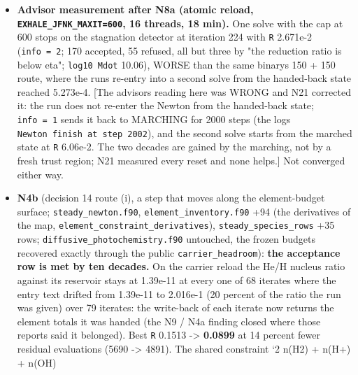 \documentclass[english,a4paper]{my_memo}
\begin{document}
\begin{itemize}
  3.800e-2 at 150, \texttt{info\ =\ 1}), and the run\textquotesingle s SECOND stationary solve (the
  code re-enters the Newton from the handed-back state, another 150
  iterations) reaches \textbf{\texttt{\textbar{}\textbar{}R\textbar{}\textbar{}} 5.273e-4, flux spread 2.3e-6}, still not
  certified (\texttt{log10\ Mdot} 10.10; exit 2), 32 min at 16 threads: the reload now
  descends four decades in 300 iterations where it stood still since B5m.
  Not converged. \textbf{Reported, not fixed}: \texttt{n\_eq\_sweeps\_model\ =\ 1} so the
  pass count, not \texttt{eq\_sweep\_reltol}, controls the closure on both
  fixtures; \texttt{EXHALE\_JFNK\_MAXIT} caps each solve, not the run;
  \texttt{fix\_active\_species\_bounds} lost its \texttt{D} argument (the epsilon-active
  width now on \texttt{state\_column\_scale}); the \texttt{{[}diag\ 4{]}} true-residual row is
  not valid for long steps (its finite-difference product is out of range).
  The fixture README updated by the advisor.
\item
  \textbf{Advisor measurement after N8a (atomic reload, \texttt{EXHALE\_JFNK\_MAXIT=600},
  16 threads, 18 min).} One solve with the cap at 600 stops on the
  stagnation detector at iteration 224 with \texttt{\textbar{}\textbar{}R\textbar{}\textbar{}} 2.671e-2 (\texttt{info\ =\ 2};
  170 accepted, 55 refused, all but three by "the reduction ratio is below
  eta"; \texttt{log10\ Mdot} 10.06), WORSE than the same binary\textquotesingle s 150 + 150 route,
  where the run\textquotesingle s re-entry into a second solve from the handed-back state
  reached 5.273e-4. {[}The advisor\textquotesingle s reading here was WRONG and N21 corrected it: the
  run does not re-enter the Newton from the handed-back state; \texttt{info\ =\ 1}
  sends it back to MARCHING for 2000 steps (the log\textquotesingle s \texttt{Newton\ finish\ at\ step\ 2002}), and the second solve starts from the marched state at
  \texttt{\textbar{}\textbar{}R\textbar{}\textbar{}} 6.06e-2. The two decades are gained by the marching, not by a
  fresh trust region; N21 measured every reset and none helps.{]} Not
  converged either way.
\item
  \textbf{N4b} (decision 14 route (i), a step that moves along the element-budget
  surface; \texttt{steady\_newton.f90}, \texttt{element\_inventory.f90} +94 (the
  derivatives of the map, \texttt{element\_constraint\_derivatives}),
  \texttt{steady\_species\_rows} +35 rows; \texttt{diffusive\_photochemistry.f90} untouched,
  the frozen budgets recovered exactly through the public
  \texttt{carrier\_headroom}): \textbf{the acceptance row is met by ten decades.} On the
  carrier reload the He/H nucleus ratio against its reservoir stays at
  1.39e-11 at every one of 68 iterates where the entry text drifted from
  1.39e-11 to 2.016e-1 (20 percent of the ratio the run was given) over 79
  iterates: the write-back of each iterate now returns the element totals
  it was handed (the N9 / N4a finding closed where those reports said it
  belonged). Best \texttt{\textbar{}\textbar{}R\textbar{}\textbar{}} 0.1513 -\textgreater{} \textbf{0.0899} at 14 percent fewer residual
  evaluations (5690 -\textgreater{} 4891). The shared constraint `2 n(H2) + n(H+) + n(OH)


\end{itemize}
\end{document}
